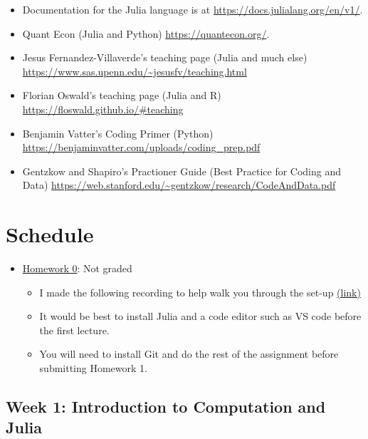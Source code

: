 \documentclass[
]{book}
\providecommand{\tightlist}{%
  \setlength{\itemsep}{0pt}\setlength{\parskip}{0pt}}
\begin{document}
\begin{itemize}
\tightlist
\item
  Documentation for the Julia language is at \url{https://docs.julialang.org/en/v1/}.
\item
  Quant Econ (Julia and Python) \url{https://quantecon.org/}.
\item
  Jesus Fernandez-Villaverde's teaching page (Julia and much else) \url{https://www.sas.upenn.edu/~jesusfv/teaching.html}
\item
  Florian Oswald's teaching page (Julia and R) \url{https://floswald.github.io/\#teaching}
\item
  Benjamin Vatter's Coding Primer (Python) \url{https://benjaminvatter.com/uploads/coding_prep.pdf}
\item
  Gentzkow and Shapiro's Practioner Guide (Best Practice for Coding and Data) \url{https://web.stanford.edu/~gentzkow/research/CodeAndData.pdf}
\end{itemize}

\hypertarget{schedule}{%
\section{Schedule}\label{schedule}}

\begin{itemize}
\tightlist
\item
  \href{https://kevinghunt.github.io/ComputationCamp/homeworks/homework0.html}{Homework 0}: Not graded

  \begin{itemize}
  \tightlist
  \item
    I made the following recording to help walk you through the set-up \href{https://uwmadison.zoom.us/rec/share/YhAbY7pjYTjU9IQcHbkOvMgeh7vr3TMKCmZTtx7jZwkm9eE5yq9qdpdQFGoGZSS5._sxKQuIJDuQ_QktU?startTime=1689710534000}{(link)}
  \item
    It would be best to install Julia and a code editor such as VS code before the first lecture.
  \item
    You will need to install Git and do the rest of the assignment before submitting Homework 1.
  \end{itemize}
\end{itemize}

\hypertarget{week-1-introduction-to-computation-and-julia}{%
\subsection{Week 1: Introduction to Computation and Julia}\label{week-1-introduction-to-computation-and-julia}}
\end{document}
